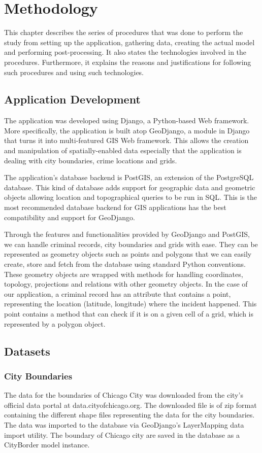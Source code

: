 \section{Methodology}
    This chapter describes the series of procedures that was done to perform the study \textemdash from setting up the application, gathering data, creating the actual model and performing post-processing. It also states the technologies involved in the procedures. Furthermore, it explains the reasons and justifications for following such procedures and using such technologies.
\subsection{Application Development}
    The application was developed using Django, a Python-based Web framework. More specifically, the application is built atop GeoDjango, a module in Django that turns it into multi-featured GIS Web framework. This allows the creation and manipulation of spatially-enabled data especially that the application is dealing with city boundaries, crime locations and grids.

    The application's database backend is PostGIS, an extension of the PostgreSQL database. This kind of database adds support for geographic data and geometric objects allowing location and topographical queries to be run in SQL. This is the most recommended database backend for GIS applications has the best compatibility and support for GeoDjango.

    Through the features and functionalities provided by GeoDjango and PostGIS, we can handle criminal records, city boundaries and grids with ease. They can be represented as geometry objects such as points and polygons that we can easily create, store and fetch from the database using standard Python conventions. These geometry objects are wrapped with methods for handling coordinates, topology, projections and relations with other geometry objects. In the case of our application, a criminal record has an attribute that contains a point, representing the location (latitude, longitude) where the incident happened. This point contains a method that can check if it is on a given cell of a grid, which is represented by a polygon object.

\subsection{Datasets}
    \subsubsection{City Boundaries}
        The data for the boundaries of Chicago City was downloaded from the city's official data portal at data.cityofchicago.org. The downloaded file is of zip format containing the different shape files representing the data for the city boundaries. The data was imported to the database via GeoDjango's LayerMapping data import utility. The boundary of Chicago city are saved in the database as a CityBorder model instance.
